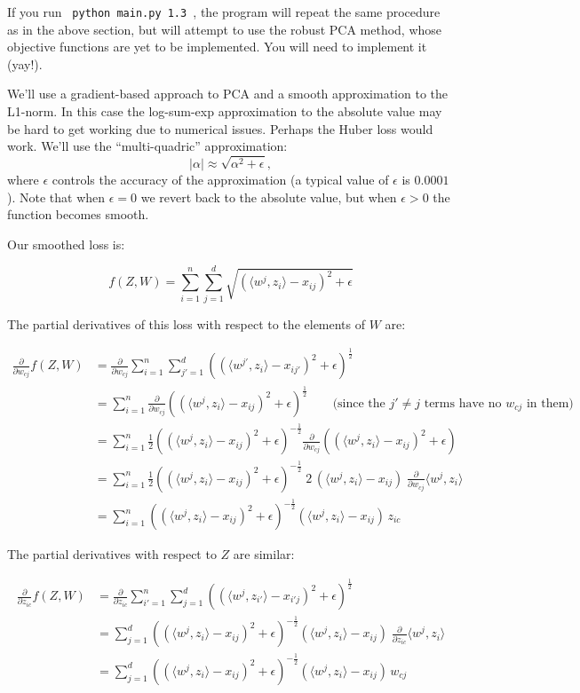 \documentclass{article}
\begin{document}
If you run \verb| python main.py 1.3 |, the program will repeat the same procedure as in the above section, but will attempt to use the robust PCA method, whose objective functions are yet to be implemented. You will need to implement it (yay!).

We'll use a gradient-based approach to PCA and a smooth approximation to the L1-norm. In this case the log-sum-exp approximation to the absolute value may be hard to get working due to numerical issues. Perhaps the Huber loss would work. We'll use the ``multi-quadric'' approximation:
\[
|\alpha| \approx \sqrt{\alpha^2 + \epsilon},
\]
where $\epsilon$ controls the accuracy of the approximation (a typical value of $\epsilon$ is $0.0001$). Note that when $\epsilon=0$ we revert back to the absolute value, but when $\epsilon>0$ the function becomes smooth.

Our smoothed loss is:

\[
f(Z,W) = \sum_{i=1}^n\sum_{j=1}^d \sqrt{(\langle w^j, z_i\rangle - x_{ij})^2 + \epsilon }
\]

The partial derivatives of this loss with respect to the elements of $W$ are:

\begin{align*}
\frac{\partial}{\partial w_{cj}} f(Z,W)
  &= \frac{\partial}{\partial w_{cj}} \sum_{i=1}^n\sum_{j'=1}^d \left( (\langle w^{j'}, z_i\rangle - x_{ij'})^2 + \epsilon \right)^{\frac12} \\
  &= \sum_{i=1}^n \frac{\partial}{\partial w_{cj}} \left( (\langle w^{j}, z_i\rangle - x_{ij})^2 + \epsilon \right)^{\frac12}  \qquad \text{(since the $j' \ne j$ terms have no $w_{cj}$ in them)} \\
  &= \sum_{i=1}^n \frac12 \left( (\langle w^{j}, z_i\rangle - x_{ij})^2 + \epsilon \right)^{-\frac12} \frac{\partial}{\partial w_{cj}} \left( (\langle w^{j}, z_i\rangle - x_{ij})^2 + \epsilon \right) \\
  &= \sum_{i=1}^n \frac12  \left( (\langle w^{j}, z_i\rangle - x_{ij})^2 + \epsilon \right)^{-\frac12} \;2\,  (\langle w^{j}, z_i\rangle - x_{ij}) \; \frac{\partial}{\partial w_{cj}} \langle w^{j}, z_i\rangle \\
  &= \sum_{i=1}^n \left( (\langle w^{j}, z_i\rangle - x_{ij})^2 + \epsilon \right)^{-\frac12}  (\langle w^j, z_i\rangle - x_{ij}) \, z_{ic}
\end{align*}

The partial derivatives with respect to $Z$ are similar:

\begin{align*}
\frac{\partial}{\partial z_{ic}} f(Z,W)
  &= \frac{\partial}{\partial z_{ic}} \sum_{i'=1}^n \sum_{j=1}^d  \left( (\langle w^j, z_{i'}\rangle - x_{i'j})^2 + \epsilon \right)^{\frac12}\\
  &= \sum_{j=1}^d  \left( (\langle w^j, z_{i}\rangle - x_{ij})^2 + \epsilon \right)^{-\frac12}   (\langle w^j, z_{i}\rangle - x_{ij}) \; \frac{\partial}{\partial z_{ic}} \langle w^j, z_i\rangle \\
  &= \sum_{j=1}^d  \left( (\langle w^j, z_i\rangle - x_{ij})^2 + \epsilon \right)^{-\frac12}  (\langle w^j, z_i\rangle - x_{ij}) \, w_{cj}
\end{align*}
\end{document}
